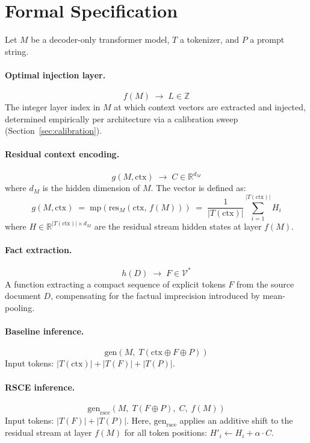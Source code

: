 \documentclass[11pt]{article}
\newcommand{\gen}{\mathrm{gen}}
\newcommand{\geni}{\mathrm{gen}_{\mathrm{rsce}}}
\newcommand{\mpool}{\mathrm{mp}}
\newcommand{\res}{\mathrm{res}}
\newcommand{\ctx}{\mathrm{ctx}}
\begin{document}
\section{Formal Specification}
\label{sec:formalism}

Let $M$ be a decoder-only transformer model, $T$ a tokenizer, and $P$ a prompt string.

\paragraph{Optimal injection layer.}
\[
    f(M) \;\rightarrow\; L \in \mathbb{Z}
\]
The integer layer index in $M$ at which context vectors are extracted and injected, determined empirically per architecture via a calibration sweep (Section~\ref{sec:calibration}).

\paragraph{Residual context encoding.}
\[
    g(M, \ctx) \;\rightarrow\; C \in \mathbb{R}^{d_M}
\]
where $d_M$ is the hidden dimension of $M$. The vector is defined as:
\[
    g(M, \ctx) \;=\; \mpool\!\left(\res_M\!\left(\ctx,\, f(M)\right)\right)
    \;=\; \frac{1}{|T(\ctx)|}\sum_{i=1}^{|T(\ctx)|} H_i
\]
where $H \in \mathbb{R}^{|T(\ctx)| \times d_M}$ are the residual stream hidden states at layer $f(M)$.

\paragraph{Fact extraction.}
\[
    h(D) \;\rightarrow\; F \in \mathcal{V}^*
\]
A function extracting a compact sequence of explicit tokens $F$ from the source document $D$, compensating for the factual imprecision introduced by mean-pooling.

\paragraph{Baseline inference.}
\[
    \gen\!\left(M,\; T(\ctx \oplus F \oplus P)\right)
\]
Input tokens: $|T(\ctx)| + |T(F)| + |T(P)|$.

\paragraph{RSCE inference.}
\[
    \geni\!\left(M,\; T(F \oplus P),\; C,\; f(M)\right)
\]
Input tokens: $|T(F)| + |T(P)|$. Here, $\geni$ applies an additive shift to the residual stream at layer $f(M)$ for all token positions: $H'_i \leftarrow H_i + \alpha \cdot C$.
\end{document}
